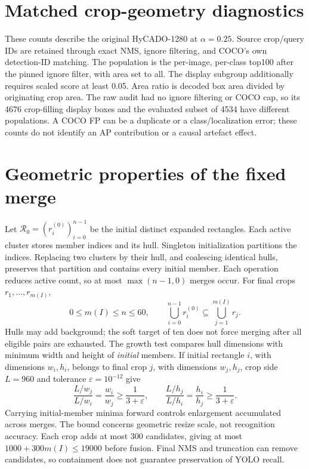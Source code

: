 \documentclass[10pt,letterpaper]{article}
\begin{document}
\section{Matched crop-geometry diagnostics}
These counts describe the original HyCADO-1280 at $\alpha=0.25$. Source crop/query IDs are retained through exact NMS, ignore filtering, and COCO's own detection-ID matching. The population is the per-image, per-class top100 after the pinned ignore filter, with area set to all. The display subgroup additionally requires scaled score at least 0.05. Area ratio is decoded box area divided by originating crop area. The raw audit had no ignore filtering or COCO cap, so its 4676 crop-filling display boxes and the evaluated subset of 4534 have different populations. A COCO FP can be a duplicate or a class/localization error; these counts do not identify an AP contribution or a causal artefact effect.
\begin{table}[h!]
\centering\footnotesize\setlength{\tabcolsep}{4pt}
\caption{Crop-source detections by box/crop area ratio, class-aware COCO matches. Precision is $\mathrm{TP}/(\mathrm{TP}+\mathrm{FP})$ within each diagnostic subset; it is not AP. No box-removal counterfactual or uncertainty interval was computed.}

\end{table}
\clearpage
\section{Geometric properties of the fixed merge}
Let $\mathcal R_0=(r_i^{(0)})_{i=0}^{n-1}$ be the initial distinct expanded rectangles. Each active cluster stores member indices and its hull. Singleton initialization partitions the indices. Replacing two clusters by their hull, and coalescing identical hulls, preserves that partition and contains every initial member. Each operation reduces active count, so at most $\max(n-1,0)$ merges occur. For final crops $r_1,\ldots,r_{m(I)}$,
\[
0\leq m(I)\leq n\leq60,\qquad
\bigcup_{i=0}^{n-1}r_i^{(0)}\subseteq\bigcup_{j=1}^{m(I)}r_j.
\]
Hulls may add background; the soft target of ten does not force merging after all eligible pairs are exhausted. The growth test compares hull dimensions with minimum width and height of \emph{initial} members. If initial rectangle $i$, with dimensions $w_i,h_i$, belongs to final crop $j$, with dimensions $w_j,h_j$, crop side $L=960$ and tolerance $\varepsilon=10^{-12}$ give
\[
\frac{L/w_j}{L/w_i}=\frac{w_i}{w_j}\geq\frac1{3+\varepsilon},\qquad
\frac{L/h_j}{L/h_i}=\frac{h_i}{h_j}\geq\frac1{3+\varepsilon}.
\]
Carrying initial-member minima forward controls enlargement accumulated across merges. The bound concerns geometric resize scale, not recognition accuracy. Each crop adds at most 300 candidates, giving at most $1000+300m(I)\leq19000$ before fusion. Final NMS and truncation can remove candidates, so containment does not guarantee preservation of YOLO recall.
\end{document}
